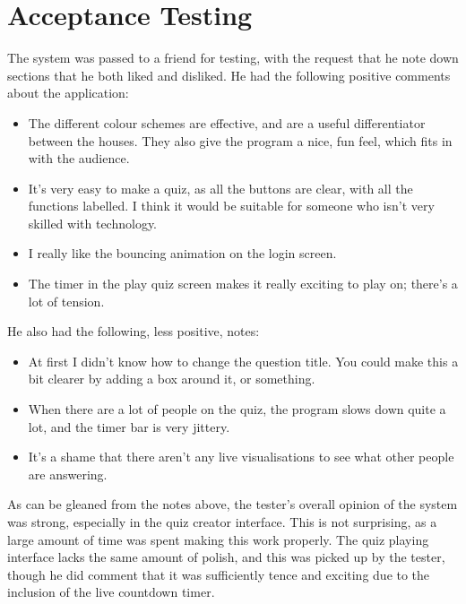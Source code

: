 \section{Acceptance Testing}
The system was passed to a friend for testing, with the request that he note down sections that he both liked and disliked. He had the following positive comments about the application:

\begin{itemize}
  \item The different colour schemes are effective, and are a useful differentiator between the houses. They also give the program a nice, fun feel, which fits in with the audience.

  \item It's very easy to make a quiz, as all the buttons are clear, with all the functions labelled. I think it would be suitable for someone who isn't very skilled with technology.

  \item I really like the bouncing animation on the login screen.

  \item The timer in the play quiz screen makes it really exciting to play on; there's a lot of tension.
\end{itemize}

He also had the following, less positive, notes:

\begin{itemize}
  \item At first I didn't know how to change the question title. You could make this a bit clearer by adding a box around it, or something.

  \item When there are a lot of people on the quiz, the program slows down quite a lot, and the timer bar is very jittery.

  \item It's a shame that there aren't any live visualisations to see what other people are answering.
\end{itemize}

As can be gleaned from the notes above, the tester's overall opinion of the system was strong, especially in the quiz creator interface. This is not surprising, as a large amount of time was spent making this work properly. The quiz playing interface lacks the same amount of polish, and this was picked up by the tester, though he did comment that it was sufficiently tence and exciting due to the inclusion of the live countdown timer.
